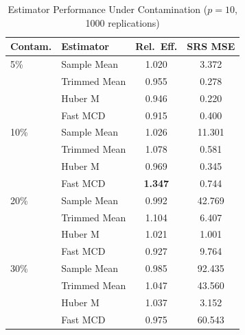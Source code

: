 \documentclass[12pt]{article}
\begin{document}
\begin{table}[htbp]
\centering
\caption{Estimator Performance Under Contamination ($p = 10$, 1000 replications)}
\label{tab:contam_p10_new}
\begin{tabular}{llcc}
\toprule
Contam. & Estimator & Rel.\ Eff. & SRS MSE \\
\midrule
5\% & Sample Mean & 1.020 & 3.372 \\
& Trimmed Mean & 0.955 & 0.278 \\
& Huber M & 0.946 & 0.220 \\
& Fast MCD & 0.915 & 0.400 \\
\midrule
10\% & Sample Mean & 1.026 & 11.301 \\
& Trimmed Mean & 1.078 & 0.581 \\
& Huber M & 0.969 & 0.345 \\
& Fast MCD & \textbf{1.347} & 0.744 \\
\midrule
20\% & Sample Mean & 0.992 & 42.769 \\
& Trimmed Mean & 1.104 & 6.407 \\
& Huber M & 1.021 & 1.001 \\
& Fast MCD & 0.927 & 9.764 \\
\midrule
30\% & Sample Mean & 0.985 & 92.435 \\
& Trimmed Mean & 1.047 & 43.560 \\
& Huber M & 1.037 & 3.152 \\
& Fast MCD & 0.975 & 60.543 \\
\bottomrule
\end{tabular}
\end{table}
\end{document}
